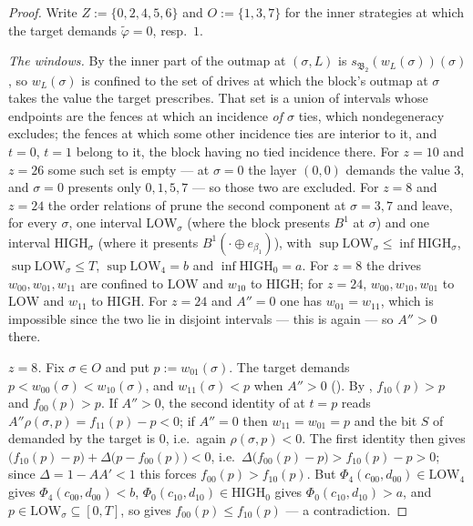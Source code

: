 \begin{proof}
Write $Z:=\{0,2,4,5,6\}$ and $O:=\{1,3,7\}$ for the inner strategies at which the target demands
$\tilde\varphi=0$, resp.\ $1$.

\emph{The windows.} By  the inner part of the outmap at $(\sigma,L)$ is
$s_{\mathfrak B_2}(w_L(\sigma))(\sigma)$, so $w_L(\sigma)$ is confined to the set of drives at
which the block's outmap at $\sigma$ takes the value the target prescribes. That set is a union
of intervals whose endpoints are the fences at which an incidence \emph{of $\sigma$} ties, which
nondegeneracy excludes; the fences at which some other incidence ties are interior to it, and
$t=0$, $t=1$ belong to it, the block having no tied incidence there. For $z=10$ and $z=26$ some
such set is empty --- at $\sigma=0$ the layer $(0,0)$ demands the value $3$, and $\sigma=0$
presents only $0,1,5,7$ --- so those two are excluded. For $z=8$ and $z=24$ the order relations
of  prune the second component at $\sigma=3,7$ and leave, for every
$\sigma$, one interval $\mathrm{LOW}_\sigma$ (where the block presents $B^{1}$ at $\sigma$) and
one interval $\mathrm{HIGH}_\sigma$ (where it presents $B^{1}(\cdot\oplus e_{\beta_1})$), with
$\sup\mathrm{LOW}_\sigma\le\inf\mathrm{HIGH}_\sigma$,
$\sup\mathrm{LOW}_\sigma\le T$, $\sup\mathrm{LOW}_4=b$ and $\inf\mathrm{HIGH}_0=a$. For $z=8$
the drives $w_{00},w_{01},w_{11}$ are confined to $\mathrm{LOW}$ and $w_{10}$ to
$\mathrm{HIGH}$; for $z=24$, $w_{00},w_{10},w_{01}$ to $\mathrm{LOW}$ and $w_{11}$ to
$\mathrm{HIGH}$. For $z=24$ and $A''=0$ one has $w_{01}=w_{11}$, which is impossible since the
two lie in disjoint intervals --- this is  again --- so $A''>0$ there.

\emph{$z=8$.} Fix $\sigma\in O$ and put $p:=w_{01}(\sigma)$. The target demands
$p<w_{00}(\sigma)<w_{10}(\sigma)$, and $w_{11}(\sigma)<p$ when $A''>0$
(). By , $f_{10}(p)>p$ and $f_{00}(p)>p$.
If $A''>0$, the second identity of  at $t=p$ reads
$A''\rho(\sigma,p)=f_{11}(p)-p<0$; if $A''=0$ then $w_{11}=w_{01}=p$ and the bit $S$ of
 demanded by the target is $0$, i.e.\ again $\rho(\sigma,p)<0$. The first
identity then gives $\bigl(f_{10}(p)-p\bigr)+\Delta\bigl(p-f_{00}(p)\bigr)<0$, i.e.\
$\Delta\bigl(f_{00}(p)-p\bigr)>f_{10}(p)-p>0$; since $\Delta=1-AA'<1$ this forces
$f_{00}(p)>f_{10}(p)$. But $\Phi_4(c_{00},d_{00})\in\mathrm{LOW}_4$ gives
$\Phi_4(c_{00},d_{00})<b$, $\Phi_0(c_{10},d_{10})\in\mathrm{HIGH}_0$ gives
$\Phi_0(c_{10},d_{10})>a$, and $p\in\mathrm{LOW}_\sigma\subseteq[0,T]$, so
\Cref{lem:ec-domination} gives $f_{00}(p)\le f_{10}(p)$ --- a contradiction.


\end{proof}
